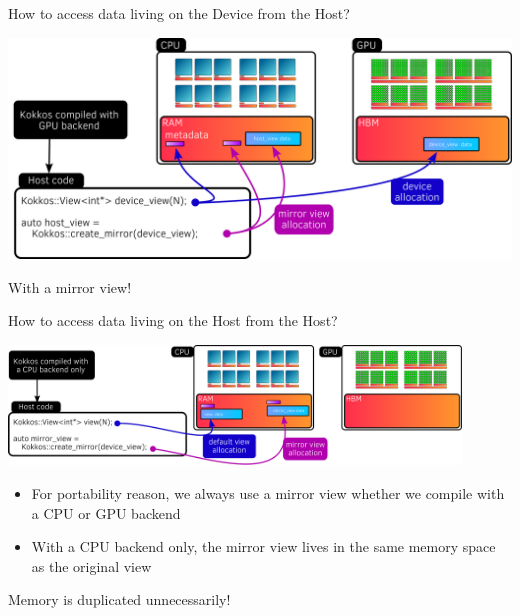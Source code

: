 \documentclass[aspectratio=169]{beamer}
\begin{document}

\begin{frame}{How to access data living on the Device from the Host?}
    \begin{center}
        \includegraphics[width=\textwidth]{device_mirror_view.png}
    \end{center}

     With a mirror view!
\end{frame}


\begin{frame}{How to access data living on the Host from the Host?}
    \begin{center}
        \includegraphics[width=0.9\textwidth]{host_mirror_view.png}
    \end{center}
    \begin{itemize}
        \item For portability reason, we always use a mirror view whether we compile with a CPU or GPU backend
        \item With a CPU backend only, the mirror view lives in the same memory space as the original view
    \end{itemize}

     Memory is duplicated unnecessarily!
\end{frame}

\end{document}
